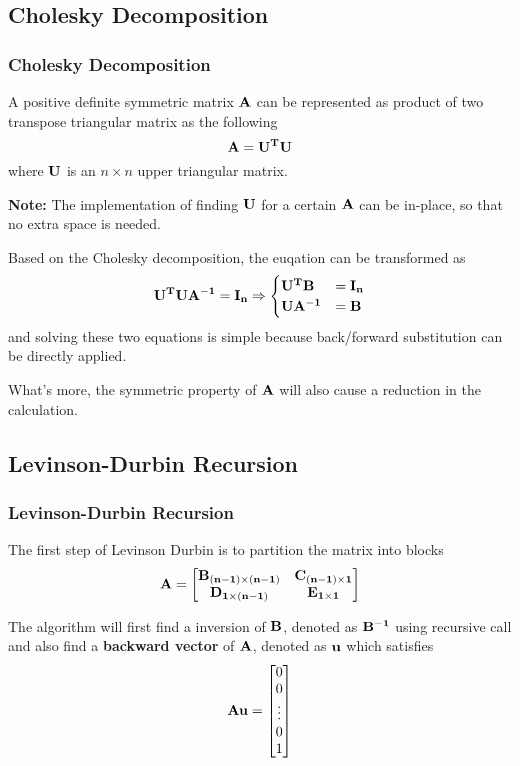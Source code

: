 \documentclass{beamer}
\begin{document}
\begin{frame}
	\subsection{Cholesky Decomposition}
	\frametitle{Cholesky Decomposition}
	A positive definite symmetric matrix ${\bf A}$ can be represented as product of two transpose triangular matrix as the following $${\bf A = U^TU}$$ where ${\bf U}$ is an $n\times n$ upper triangular matrix.

	{\bf Note: }The implementation of finding ${\bf U}$ for a certain ${\bf A}$ can be in-place, so that no extra space is needed.
	
\end{frame}

\begin{frame}
	Based on the Cholesky decomposition, the euqation can be transformed as $${\bf U^TUA^{-1}=I_n \Rightarrow \begin{cases}\bf U^TB &= \bf I_n\\\bf UA^{-1}&=\bf B\end{cases}}$$ and solving these two equations is simple because back/forward substitution can be directly applied. 
		
	What's more, the symmetric property of ${\bf A}$ will also cause a reduction in the calculation.
\end{frame}

\begin{frame}
	\subsection{Levinson-Durbin Recursion}
	\frametitle{Levinson-Durbin Recursion}
The first step of Levinson Durbin is to partition the matrix into blocks $$ {\bf A = \left[\begin{matrix}\bf B_{(n-1)\times(n-1)} & \bf C_{(n-1)\times 1} \\\bf D_{1\times (n-1)} & \bf E_{1\times 1}\end{matrix}\right]}$$

The algorithm will first find a inversion of ${\bf B}$, denoted as ${\bf B^{-1}}$ using recursive call and also find a {\bf backward vector} of ${\bf A}$, denoted as ${\bf u}$ which satisfies $${\bf Au} = \left[\begin{matrix} 0\\0\\ \vdots \\0\\1 \end{matrix}\right]$$
\end{frame}
\end{document}
